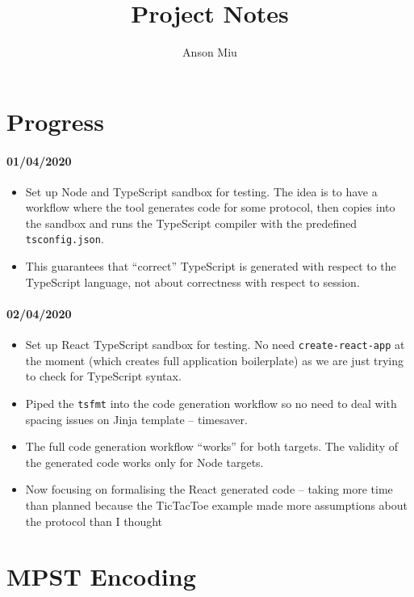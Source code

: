 \documentclass{article}
\title{Project Notes}
\author{Anson Miu}
\begin{document}
\maketitle

\section{Progress}

\paragraph{01/04/2020}
\begin{itemize}
\item 
Set up Node and TypeScript sandbox for testing.
The idea is to have a workflow where the
tool generates code for some protocol,
then copies into the sandbox and runs
the TypeScript compiler with the predefined
\texttt{tsconfig.json}. 

\item
This guarantees that ``correct'' TypeScript is
generated with respect to the TypeScript 
language, not about correctness with respect
to session.
\end{itemize}


\paragraph{02/04/2020}
\begin{itemize}
\item
Set up React TypeScript sandbox for testing.
No need \texttt{create-react-app} at
the moment (which creates full application
boilerplate) as we are just trying to check
for TypeScript syntax.

\item
Piped the \texttt{tsfmt} into the code 
generation workflow so no need to deal with
spacing issues on Jinja template -- timesaver.

\item
The full code generation workflow ``works'' for 
both targets. The validity of the generated 
code works only for Node targets.

\item
Now focusing on formalising the React generated 
code -- taking more time than planned because
the TicTacToe example made more assumptions
about the protocol than I thought
\end{itemize}


\section{MPST Encoding}
\end{document}
